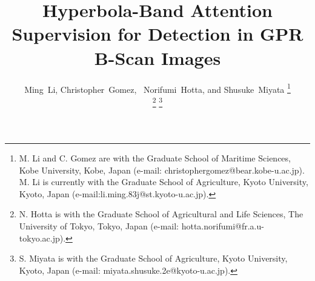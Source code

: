 \documentclass[lettersize,journal]{IEEEtran}
\begin{document}
\title{Hyperbola-Band Attention Supervision for Detection in GPR B-Scan Images}


\author{Ming~Li,
        Christopher~Gomez,
        ~Norifumi~Hotta,
        and Shusuke~Miyata
\thanks{M. Li and C. Gomez are with the Graduate School of Maritime Sciences, Kobe University, Kobe, Japan (e-mail: christophergomez@bear.kobe-u.ac.jp). M. Li is currently with the Graduate School of Agriculture, Kyoto University, Kyoto, Japan
(e-mail:li.ming.83j@st.kyoto-u.ac.jp).}


\thanks{N. Hotta is with the Graduate School of Agricultural and Life Sciences, The University of Tokyo, Tokyo, Japan (e-mail: hotta.norifumi@fr.a.u-tokyo.ac.jp).}
\thanks{S. Miyata is with the Graduate School of Agriculture, Kyoto University, Kyoto, Japan (e-mail: miyata.shusuke.2e@kyoto-u.ac.jp).}

}



\maketitle
\end{document}
